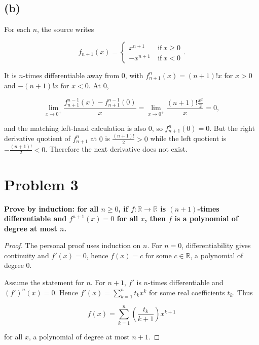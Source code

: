 \subsection{(b)}

For each \(n\), the source writes

\[f_{n + 1}(x) = \left\{ \begin{matrix}
{x^{n + 1}\ } & {\text{if}\ x \geq 0} \\
{- x^{n + 1}\ } & {\text{if}\ x < 0}
\end{matrix} \right..\]

It is \(n\)-times differentiable away from \(0\), with \(f_{n + 1}^{n}(x) = \left( {n + 1} \right)!x\) for \(x > 0\) and \(- \left( {n + 1} \right)!x\) for \(x < 0\). At \(0\),

\[\lim\limits_{x\rightarrow 0^{+}}\frac{f_{n + 1}^{n - 1}(x) - f_{n + 1}^{n - 1}(0)}{x} = \lim\limits_{x\rightarrow 0^{+}}\frac{\left( {n + 1} \right)!\frac{x^{2}}{2}}{x} = 0,\]

and the matching left-hand calculation is also \(0\), so \(f_{n + 1}^{n}(0) = 0\). But the right derivative quotient of \(f_{n + 1}^{n}\) at \(0\) is \(\frac{\left( {n + 1} \right)!}{2} > 0\) while the left quotient is \(- \frac{\left( {n + 1} \right)!}{2} < 0\). Therefore the next derivative does not exist.

\section{Problem 3}

\textbf{Prove by induction: for all \(n \geq 0\), if \(f:\mathbb{R}\rightarrow\mathbb{R}\) is \(\left( {n + 1} \right)\)-times differentiable and \(f^{n + 1}(x) = 0\) for all \(x\), then \(f\) is a polynomial of degree at most \(n\).}

\begin{proof}

The personal proof uses induction on \(n\). For \(n = 0\), differentiability gives continuity and \(f'(x) = 0\), hence \(f(x) = c\) for some \(c \in \mathbb{R}\), a polynomial of degree \(0\).

Assume the statement for \(n\). For \(n + 1\), \(f'\) is \(n\)-times differentiable and \(\left( f' \right)^{n}(x) = 0\). Hence \(f'(x) = \sum_{k = 1}^{n}t_{k}x^{k}\) for some real coefficients \(t_{k}\). Thus

\[f(x) = \sum\limits_{k = 1}^{n}\left( \frac{t_{k}}{k + 1} \right)x^{k + 1}\]

for all \(x\), a polynomial of degree at most \(n + 1\).

\end{proof}

